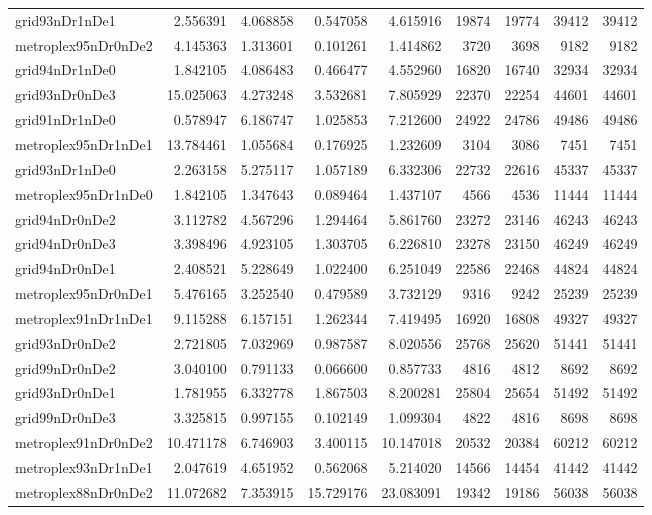 \begin{longtable}{|l|r|r|r|r|r|r|r|r|}
grid93nDr1nDe1 & 2.556391 & 4.068858 & 0.547058 & 4.615916 & 19874 & 19774 & 39412 & 39412 \\
metroplex95nDr0nDe2 & 4.145363 & 1.313601 & 0.101261 & 1.414862 & 3720 & 3698 & 9182 & 9182 \\
grid94nDr1nDe0 & 1.842105 & 4.086483 & 0.466477 & 4.552960 & 16820 & 16740 & 32934 & 32934 \\
grid93nDr0nDe3 & 15.025063 & 4.273248 & 3.532681 & 7.805929 & 22370 & 22254 & 44601 & 44601 \\
grid91nDr1nDe0 & 0.578947 & 6.186747 & 1.025853 & 7.212600 & 24922 & 24786 & 49486 & 49486 \\
metroplex95nDr1nDe1 & 13.784461 & 1.055684 & 0.176925 & 1.232609 & 3104 & 3086 & 7451 & 7451 \\
grid93nDr1nDe0 & 2.263158 & 5.275117 & 1.057189 & 6.332306 & 22732 & 22616 & 45337 & 45337 \\
metroplex95nDr1nDe0 & 1.842105 & 1.347643 & 0.089464 & 1.437107 & 4566 & 4536 & 11444 & 11444 \\
grid94nDr0nDe2 & 3.112782 & 4.567296 & 1.294464 & 5.861760 & 23272 & 23146 & 46243 & 46243 \\
grid94nDr0nDe3 & 3.398496 & 4.923105 & 1.303705 & 6.226810 & 23278 & 23150 & 46249 & 46249 \\
grid94nDr0nDe1 & 2.408521 & 5.228649 & 1.022400 & 6.251049 & 22586 & 22468 & 44824 & 44824 \\
metroplex95nDr0nDe1 & 5.476165 & 3.252540 & 0.479589 & 3.732129 & 9316 & 9242 & 25239 & 25239 \\
metroplex91nDr1nDe1 & 9.115288 & 6.157151 & 1.262344 & 7.419495 & 16920 & 16808 & 49327 & 49327 \\
grid93nDr0nDe2 & 2.721805 & 7.032969 & 0.987587 & 8.020556 & 25768 & 25620 & 51441 & 51441 \\
grid99nDr0nDe2 & 3.040100 & 0.791133 & 0.066600 & 0.857733 & 4816 & 4812 & 8692 & 8692 \\
grid93nDr0nDe1 & 1.781955 & 6.332778 & 1.867503 & 8.200281 & 25804 & 25654 & 51492 & 51492 \\
grid99nDr0nDe3 & 3.325815 & 0.997155 & 0.102149 & 1.099304 & 4822 & 4816 & 8698 & 8698 \\
metroplex91nDr0nDe2 & 10.471178 & 6.746903 & 3.400115 & 10.147018 & 20532 & 20384 & 60212 & 60212 \\
metroplex93nDr1nDe1 & 2.047619 & 4.651952 & 0.562068 & 5.214020 & 14566 & 14454 & 41442 & 41442 \\
metroplex88nDr0nDe2 & 11.072682 & 7.353915 & 15.729176 & 23.083091 & 19342 & 19186 & 56038 & 56038 \\

\end{longtable}

